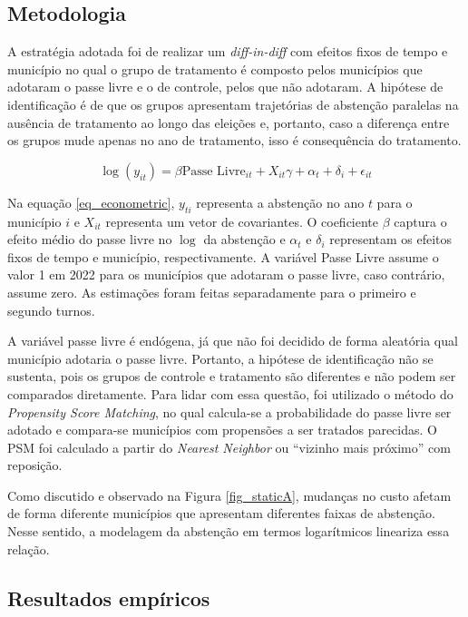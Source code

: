 \subsection{Metodologia}

A estratégia adotada foi de realizar um \textit{diff-in-diff} com efeitos fixos de tempo e município no qual o grupo de tratamento é composto pelos municípios que adotaram o passe livre e o de controle, pelos que não adotaram. A hipótese de identificação é de que os grupos apresentam trajetórias de abstenção paralelas na ausência de tratamento ao longo das eleições e, portanto, caso a diferença entre os grupos mude apenas no ano de tratamento, isso é consequência do tratamento.

\begin{equation}
\label{eq_econometric}
    \log{(y_{it})}=\beta\text{Passe Livre}_{it} + X_{it}\gamma + \alpha_t + \delta_i + \epsilon_{it}
\end{equation}

Na equação \ref{eq_econometric}, $y_{ti}$ representa a abstenção no ano $t$ para o município $i$ e $X_{it}$ representa um vetor de covariantes. O coeficiente $\beta$ captura o efeito médio do passe livre no $\log$ da abstenção e $\alpha_t$ e $\delta_i$ representam os efeitos fixos de tempo e município, respectivamente. A variável Passe Livre assume o valor 1 em 2022 para os municípios que adotaram o passe livre, caso contrário, assume zero. As estimações foram feitas separadamente para o primeiro e segundo turnos. 

A variável passe livre é endógena, já que não foi decidido de forma aleatória qual município adotaria o passe livre. Portanto, a hipótese de identificação não se sustenta, pois os grupos de controle e tratamento são diferentes e não podem ser comparados diretamente. Para lidar com essa questão, foi utilizado o método do \textit{Propensity Score Matching}, no qual calcula-se a probabilidade do passe livre ser adotado e compara-se municípios com propensões a ser tratados parecidas. O PSM foi calculado a partir do \textit{Nearest Neighbor} ou ``vizinho mais próximo'' com reposição.

Como discutido e observado na Figura \ref{fig_staticA}, mudanças no custo afetam de forma diferente municípios que apresentam diferentes faixas de abstenção. Nesse sentido, a modelagem da abstenção em termos logarítmicos lineariza essa relação.

\subsection{Resultados empíricos}

